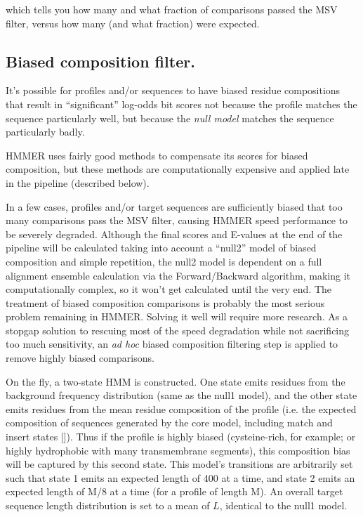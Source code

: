  which tells you how many and what fraction of comparisons passed the
 MSV filter, versus how many (and what fraction) were expected. 


\subsection{Biased composition filter.}

It's possible for profiles and/or sequences to have biased residue
compositions that result in ``significant'' log-odds bit scores not
because the profile matches the sequence particularly well, but
because the \emph{null model} matches the sequence particularly badly.

HMMER uses fairly good methods to compensate its scores for biased
composition, but these methods are computationally expensive and
applied late in the pipeline (described below).

In a few cases, profiles and/or target sequences are sufficiently
biased that too many comparisons pass the MSV filter, causing HMMER
speed performance to be severely degraded. Although the final scores
and E-values at the end of the pipeline will be calculated taking into
account a ``null2'' model of biased composition and simple repetition,
the null2 model is dependent on a full alignment ensemble calculation
via the Forward/Backward algorithm, making it computationally complex,
so it won't get calculated until the very end. The treatment of biased
composition comparisons is probably the most serious problem remaining
in HMMER. Solving it well will require more research. As a stopgap
solution to rescuing most of the speed degradation while not
sacrificing too much sensitivity, an \emph{ad hoc} biased composition
filtering step is applied to remove highly biased comparisons.

On the fly, a two-state HMM is constructed. One state emits residues
from the background frequency distribution (same as the null1 model),
and the other state emits residues from the mean residue composition
of the profile (i.e. the expected composition of sequences generated
by the core model, including match and insert states
[]). Thus if the profile is
highly biased (cysteine-rich, for example; or highly hydrophobic with
many transmembrane segments), this composition bias will be captured
by this second state. This model's transitions are arbitrarily set
such that state 1 emits an expected length of 400 at a time, and state
2 emits an expected length of M/8 at a time (for a profile of length
M). An overall target sequence length distribution is set to a mean of
$L$, identical to the null1 model.

